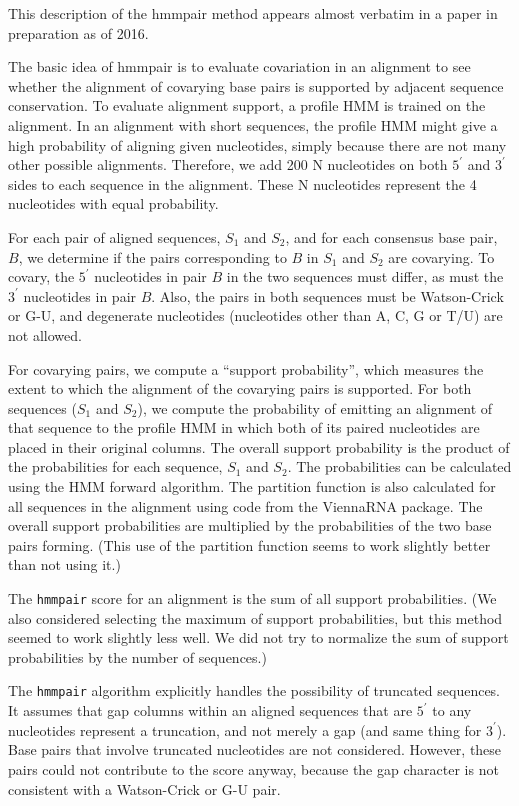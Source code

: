 \documentclass[letterpaper,12pt]{report}
\begin{document}
This description of the hmmpair method appears almost verbatim in a paper in preparation as of 2016.

The basic idea of hmmpair is to evaluate covariation in an alignment to see whether the alignment of covarying base pairs is supported by adjacent sequence conservation. To evaluate alignment support, a profile HMM is trained on the alignment. In an alignment with short sequences, the profile HMM might give a high probability of aligning given nucleotides, simply because there are not many other possible alignments. Therefore, we add 200 N nucleotides on both $5^\prime$ and $3^\prime$ sides to each sequence in the alignment. These N nucleotides represent the 4 nucleotides with equal probability.

For each pair of aligned sequences, $S_1$ and $S_2$, and for each consensus base pair, $B$, we determine if the pairs corresponding to $B$ in $S_1$ and $S_2$ are covarying. To covary, the $5^\prime$ nucleotides in pair $B$ in the two sequences must differ, as must the $3^\prime$ nucleotides in pair $B$. Also, the pairs in both sequences must be Watson-Crick or G-U, and degenerate nucleotides (nucleotides other than A, C, G or T/U) are not allowed.

For covarying pairs, we compute a ``support probability'', which measures the extent to which the alignment of the covarying pairs is supported. For both sequences ($S_1$ and $S_2$), we compute the probability of emitting an alignment of that sequence to the profile HMM in which both of its paired nucleotides are placed in their original columns. The overall support probability is the product of the probabilities for each sequence, $S_1$ and $S_2$. The probabilities can be calculated using the HMM forward algorithm. The partition function is also calculated for all sequences in the alignment using code from the ViennaRNA package. The overall support probabilities are multiplied by the probabilities of the two base pairs forming. (This use of the partition function seems to work slightly better than not using it.)

The {\tt hmmpair} score for an alignment is the sum of all support probabilities. (We also considered selecting the maximum of support probabilities, but this method seemed to work slightly less well. We did not try to normalize the sum of support probabilities by the number of sequences.)

The {\tt hmmpair} algorithm explicitly handles the possibility of truncated sequences. It assumes that gap columns within an aligned sequences that are $5^\prime$ to any nucleotides represent a truncation, and not merely a gap (and same thing for $3^\prime$). Base pairs that involve truncated nucleotides are not considered. However, these pairs could not contribute to the score anyway, because the gap character is not consistent with a Watson-Crick or G-U pair.
\end{document}
